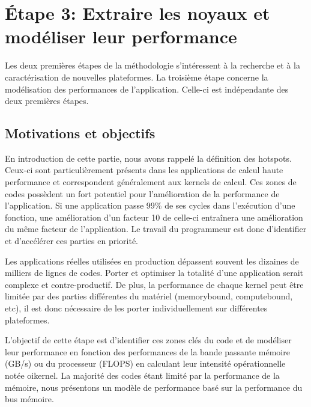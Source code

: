 \section{Étape 3: Extraire les noyaux et modéliser leur performance} \label{sec:methodo_step3}

Les deux premières étapes de la méthodologie s'intéressent à la recherche et à la caractérisation de nouvelles plateformes. La troisième étape concerne la modélisation des performances de l'application. Celle-ci est indépendante des deux premières étapes.


\subsection{Motivations et objectifs}


    En introduction de cette partie, nous avons rappelé la définition des \glspl{hotspot}. Ceux-ci sont particulièrement présents dans les applications de calcul haute performance et correspondent généralement aux \glspl{kernel} de calcul. Ces zones de codes possèdent un fort potentiel pour l'amélioration de la performance de l'application.  Si une application passe 99\% de ses cycles dans l'exécution d'une fonction, une amélioration d'un facteur 10 de celle-ci entraînera une amélioration du même facteur de l'application. Le travail du programmeur est donc d'identifier et d'accélérer ces parties en priorité.
    
    Les applications réelles utilisées en production dépassent souvent les dizaines de milliers de lignes de codes. Porter et optimiser la totalité d'une application serait complexe et contre-productif. De plus, la performance de chaque \gls{kernel} peut être limitée par des parties différentes du matériel (\gls{memorybound}, \gls{computebound}, etc), il est donc nécessaire de les porter individuellement sur différentes plateformes. 
    
    L'objectif de cette étape est d'identifier ces zones clés du code et de modéliser leur performance en fonction des performances de la bande passante mémoire (GB/s) ou du processeur (\gls{FLOPS}) en calculant leur intensité opérationnelle notée \gls{oikernel}. La majorité des codes étant limité par la performance de la mémoire, nous présentons un modèle de performance basé sur la performance du bus mémoire. 


